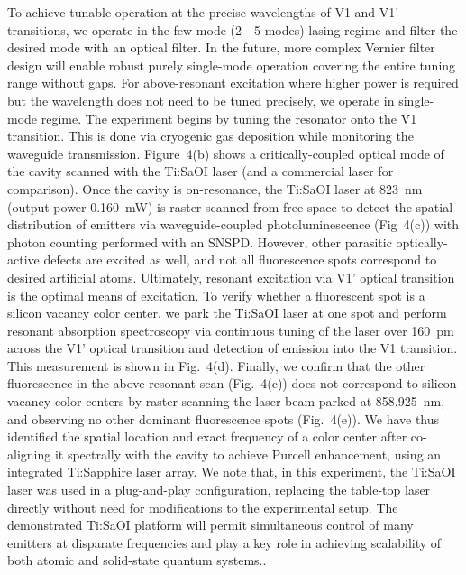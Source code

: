 \documentclass[amsmath, amsthm, amssymb, aps, prb, superscriptaddress, twocolumn, nofootinbib, 10pt]{revtex4-1}%
\begin{document}
To achieve tunable operation at the precise wavelengths of V1 and V1' transitions, we operate in the few-mode (2 - 5 modes) lasing regime and filter the desired mode with an optical filter. In the future, more complex Vernier filter design will enable robust purely single-mode operation covering the entire tuning range without gaps. For above-resonant excitation where higher power is required but the wavelength does not need to be tuned precisely, we operate in single-mode regime. The experiment begins by tuning the resonator onto the V1 transition. This is done via cryogenic gas deposition while monitoring the waveguide transmission\cite{lukin2023two}. Figure~4(b) shows a critically-coupled optical mode of the cavity scanned with the Ti:SaOI laser (and a commercial laser for comparison). Once the cavity is on-resonance, the Ti:SaOI laser at 823~nm (output power 0.160~mW) is raster-scanned from free-space to detect the spatial distribution of emitters via waveguide-coupled photoluminescence (Fig~4(c)) with photon counting performed with an SNSPD. However, other parasitic optically-active defects are excited as well, and not all fluorescence spots correspond to desired artificial atoms. Ultimately, resonant excitation via V1' optical transition is the optimal means of excitation. To verify whether a fluorescent spot is a silicon vacancy color center, we park the Ti:SaOI laser at one spot and perform resonant absorption spectroscopy via continuous tuning of the laser over 160~pm across the V1' optical transition and detection of emission into the V1 transition. This measurement is shown in Fig.~4(d). Finally, we confirm that the other fluorescence in the above-resonant scan (Fig.~4(c)) does not correspond to silicon vacancy color centers by raster-scanning the laser beam parked at 858.925~nm, and observing no other dominant fluorescence spots (Fig.~4(e)). We have thus identified the spatial location and exact frequency of a color center after co-aligning it spectrally with the cavity to achieve Purcell enhancement, using an integrated Ti:Sapphire laser array. We note that, in this experiment, the Ti:SaOI laser was used in a plug-and-play configuration, replacing the table-top laser directly without need for modifications to the experimental setup. The demonstrated Ti:SaOI platform will permit simultaneous control of many emitters at disparate frequencies and play a key role in achieving scalability of both atomic and solid-state quantum systems.\cite{levonian2022optical}.
\end{document}
